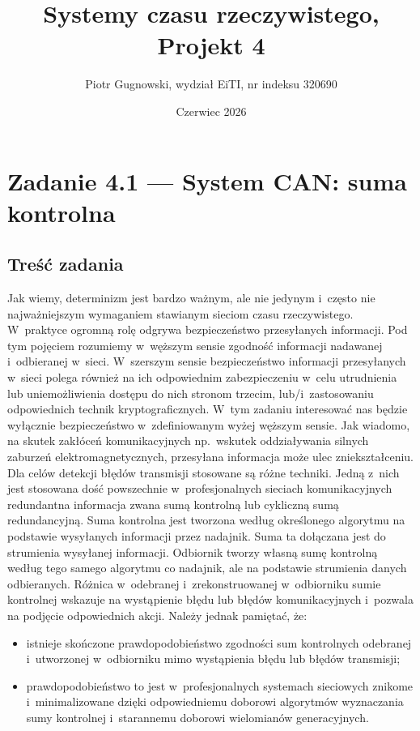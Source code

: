 \documentclass[12pt,a4paper]{article}
\title{Systemy czasu rzeczywistego, Projekt 4}
\author{Piotr Gugnowski, wydział EiTI, nr indeksu 320690}
\date{Czerwiec 2026}
\begin{document}
\maketitle

\section*{Zadanie 4.1 — System CAN: suma kontrolna}

\subsection*{Treść zadania}

Jak wiemy, determinizm jest bardzo ważnym, ale nie jedynym i~często nie
najważniejszym wymaganiem stawianym sieciom czasu rzeczywistego. W~praktyce
ogromną rolę odgrywa bezpieczeństwo przesyłanych informacji. Pod tym pojęciem
rozumiemy w~węższym sensie zgodność informacji nadawanej i~odbieranej w~sieci.
W~szerszym sensie bezpieczeństwo informacji przesyłanych w~sieci polega również
na ich odpowiednim zabezpieczeniu w~celu utrudnienia lub uniemożliwienia dostępu
do nich stronom trzecim, lub/i~zastosowaniu odpowiednich technik kryptograficznych.
W~tym zadaniu interesować nas będzie wyłącznie bezpieczeństwo w~zdefiniowanym
wyżej węższym sensie. Jak wiadomo, na skutek zakłóceń komunikacyjnych np.\
wskutek oddziaływania silnych zaburzeń elektromagnetycznych, przesyłana
informacja może ulec zniekształceniu. Dla celów detekcji błędów transmisji
stosowane są różne techniki. Jedną z~nich jest stosowana dość powszechnie
w~profesjonalnych sieciach komunikacyjnych redundantna informacja zwana sumą
kontrolną lub cykliczną sumą redundancyjną. Suma kontrolna jest tworzona według
określonego algorytmu na podstawie wysyłanych informacji przez nadajnik.
Suma ta dołączana jest do strumienia wysyłanej informacji. Odbiornik tworzy własną
sumę kontrolną według tego samego algorytmu co nadajnik, ale na podstawie
strumienia danych odbieranych. Różnica w~odebranej i~zrekonstruowanej w~odbiorniku
sumie kontrolnej wskazuje na wystąpienie błędu lub błędów komunikacyjnych
i~pozwala na podjęcie odpowiednich akcji. Należy jednak pamiętać, że:

\begin{itemize}
    \item istnieje skończone prawdopodobieństwo zgodności sum kontrolnych odebranej
          i~utworzonej w~odbiorniku mimo wystąpienia błędu lub błędów transmisji;
    \item prawdopodobieństwo to jest w~profesjonalnych systemach sieciowych znikome
          i~minimalizowane dzięki odpowiedniemu doborowi algorytmów wyznaczania sumy
          kontrolnej i~starannemu doborowi wielomianów generacyjnych.
\end{itemize}
\end{document}
